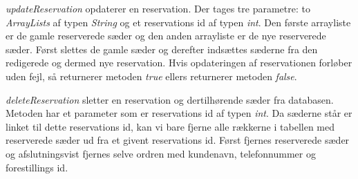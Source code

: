 \documentclass[final]{report}
\begin{document}
\emph{updateReservation} opdaterer en reservation. Der tages tre parametre: to \emph{ArrayLists} af typen \emph{String} og et reservations id af typen \emph{int}. Den første arrayliste er de gamle reserverede sæder og den anden arrayliste er de nye reserverede sæder. Først slettes de gamle sæder og derefter indsættes sæderne fra den redigerede og dermed nye reservation. Hvis opdateringen af reservationen forløber uden fejl, så returnerer metoden \emph{true} ellers returnerer metoden \emph{false}. 

\emph{deleteReservation} sletter en reservation og dertilhørende sæder fra databasen. Metoden har et parameter som er reservations id af typen \emph{int}. Da sæderne står er linket til dette reservations id, kan vi bare fjerne alle rækkerne i tabellen med reserverede sæder ud fra et givent reservations id. Først fjernes reserverede sæder og afslutningsvist fjernes selve ordren med kundenavn, telefonnummer og forestillings id. 
\end{document}
